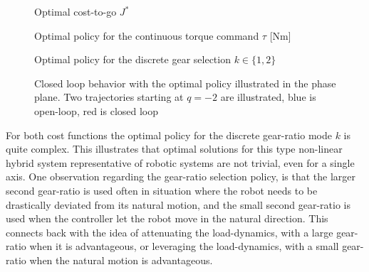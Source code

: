 \begin{figure}[p]
        \centering
        \caption{Optimal cost-to-go $J^*$}\label{fig:J}
\end{figure}

\begin{figure}[p]
        \centering
        \caption{Optimal policy for the continuous torque command $\tau$ [Nm]}\label{fig:u0}
\end{figure}

\begin{figure}[p]
        \centering
        \caption{Optimal policy for the discrete gear selection $k \in \{1,2\}$}\label{fig:u1}
\end{figure}

\begin{figure}[p]
        \centering
        \caption[Closed loop behavior in the phase plane]{Closed loop behavior with the optimal policy illustrated in the phase plane. Two trajectories starting at $q=-2$ are illustrated, blue is open-loop, red is closed loop}\label{fig:phase_plane}
\end{figure}

For both cost functions the optimal policy for the discrete gear-ratio mode $k$ is quite complex. This illustrates that optimal solutions for this type non-linear hybrid system representative of robotic systems are not trivial, even for a single axis. One observation regarding the gear-ratio selection policy, is that the larger second gear-ratio is used often in situation where the robot needs to be drastically deviated from its natural motion, and the small second gear-ratio is used when the controller let the robot move in the natural direction. This connects back with the idea of attenuating the load-dynamics, with a large gear-ratio when it is advantageous, or leveraging the load-dynamics, with a small gear-ratio when the natural motion is advantageous. 



